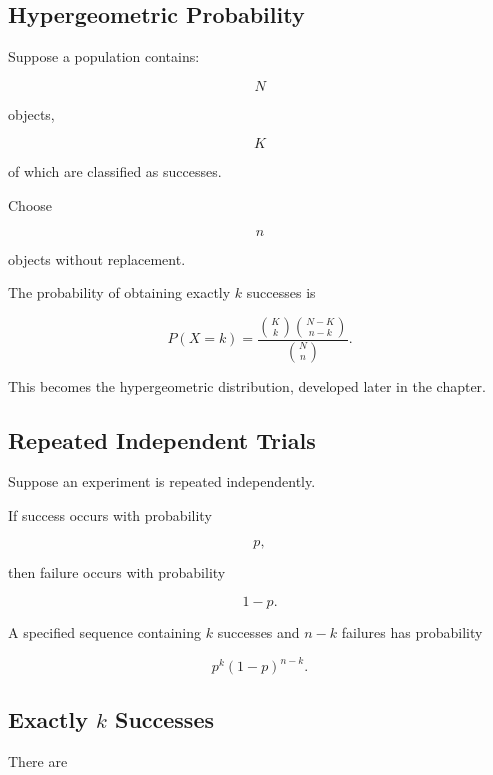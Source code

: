 \subsection{Hypergeometric Probability}
\label{subsec:hypergeometric-probability-preview}

Suppose a population contains:

\[
N
\]

objects,

\[
K
\]

of which are classified as successes.

Choose

\[
n
\]

objects without replacement.

The probability of obtaining exactly \(k\) successes is

\[
\boxed{
P(X=k)
=
\frac{
\binom{K}{k}
\binom{N-K}{n-k}
}{
\binom{N}{n}
}.
}
\]

This becomes the hypergeometric distribution, developed later in the
chapter.

\subsection{Repeated Independent Trials}
\label{subsec:repeated-independent-trials}

Suppose an experiment is repeated independently.

If success occurs with probability

\[
p,
\]

then failure occurs with probability

\[
1-p.
\]

A specified sequence containing \(k\) successes and \(n-k\) failures
has probability

\[
\boxed{
p^k(1-p)^{n-k}.
}
\]

\subsection{Exactly \(k\) Successes}
\label{subsec:exactly-k-successes}

There are

